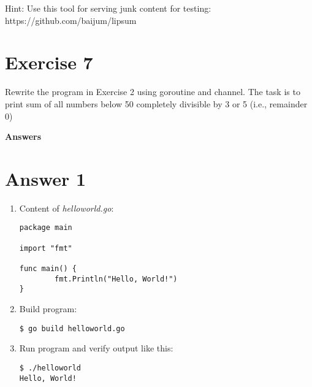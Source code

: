 \documentclass[11pt,a4paper]{article}
\begin{document}
\noindent
Hint: Use this tool for serving junk content for testing:
https://github.com/baijum/lipsum

\section*{Exercise 7}

Rewrite the program in Exercise 2 using goroutine and channel.  The
task is to print sum of all numbers below 50 completely divisible by 3
or 5 (i.e., remainder 0)

\newpage

\centerline{\LARGE\bf Answers}
\section*{Answer 1}

\begin{enumerate}
\item Content of {\it helloworld.go}:
\begin{verbatim}
package main

import "fmt"

func main() {
        fmt.Println("Hello, World!")
}
\end{verbatim}

\item Build program:
\begin{verbatim}
$ go build helloworld.go
\end{verbatim}

\item Run program and verify output like this:
\begin{verbatim}
$ ./helloworld
Hello, World!
\end{verbatim}
\end{enumerate}
\end{document}
